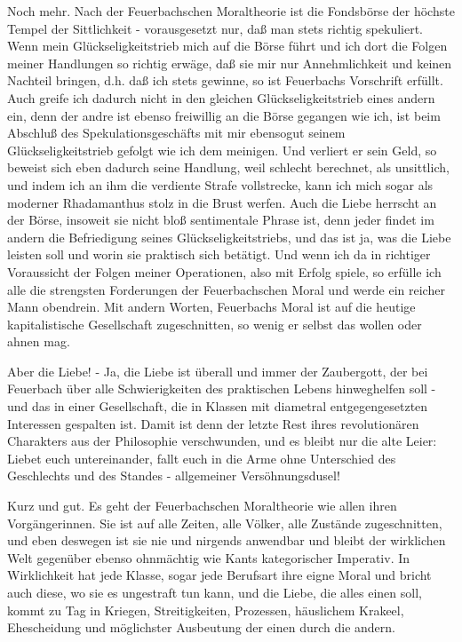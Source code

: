 Noch mehr. Nach der Feuerbachschen Moraltheorie ist die
Fondsbörse der höchste Tempel der Sittlichkeit - vorausgesetzt nur, daß
man stets richtig spekuliert. Wenn mein Glückseligkeitstrieb mich auf
die Börse führt und ich dort die Folgen meiner Handlungen so richtig
erwäge, daß sie mir  nur Annehmlichkeit und keinen Nachteil bringen,
d.h. daß ich stets gewinne, so ist Feuerbachs Vorschrift erfüllt. Auch
greife ich dadurch nicht in den gleichen Glückseligkeitstrieb eines
andern ein, denn der andre ist ebenso freiwillig an die Börse gegangen
wie ich, ist beim Abschluß des Spekulationsgeschäfts mit mir ebensogut
seinem Glückseligkeitstrieb gefolgt wie ich dem meinigen. Und verliert
er sein Geld, so beweist sich eben dadurch seine Handlung, weil schlecht
berechnet, als unsittlich, und indem ich an ihm die verdiente Strafe
vollstrecke, kann ich mich sogar als moderner Rhadamanthus stolz in die
Brust werfen. Auch die Liebe herrscht an der Börse, insoweit sie nicht
bloß sentimentale Phrase ist, denn jeder findet im andern die
Befriedigung seines Glückseligkeitstriebs, und das ist ja, was die Liebe
leisten soll und worin sie praktisch sich betätigt. Und wenn ich da in
richtiger Voraussicht der Folgen meiner Operationen, also mit Erfolg
spiele, so erfülle ich alle die strengsten Forderungen der
Feuerbachschen Moral und werde ein reicher Mann obendrein. Mit andern
Worten, Feuerbachs Moral ist auf die heutige kapitalistische
Gesellschaft zugeschnitten, so wenig er selbst das wollen oder ahnen
mag.

Aber die Liebe! - Ja, die Liebe ist überall und immer der
Zaubergott, der bei Feuerbach über alle Schwierigkeiten des praktischen
Lebens hinweghelfen soll - und das in einer Gesellschaft, die in Klassen
mit diametral entgegengesetzten Interessen gespalten ist. Damit ist denn
der letzte Rest ihres revolutionären Charakters aus der Philosophie
verschwunden, und es bleibt nur die alte Leier: Liebet euch
untereinander, fallt euch in die Arme ohne Unterschied des Geschlechts
und des Standes - allgemeiner Versöhnungsdusel!

Kurz und gut. Es geht der Feuerbachschen Moraltheorie wie allen
ihren Vorgängerinnen. Sie ist auf alle Zeiten, alle Völker, alle
Zustände zugeschnitten, und eben deswegen ist sie nie und nirgends
anwendbar und bleibt der wirklichen Welt gegenüber ebenso ohnmächtig wie
Kants kategorischer Imperativ. In Wirklichkeit hat jede Klasse, sogar
jede Berufsart ihre eigne Moral und bricht auch diese, wo sie es
ungestraft tun kann, und die Liebe, die alles einen soll, kommt zu Tag
in Kriegen, Streitigkeiten, Prozessen, häuslichem Krakeel, Ehescheidung
und möglichster Ausbeutung der einen durch die andern.

